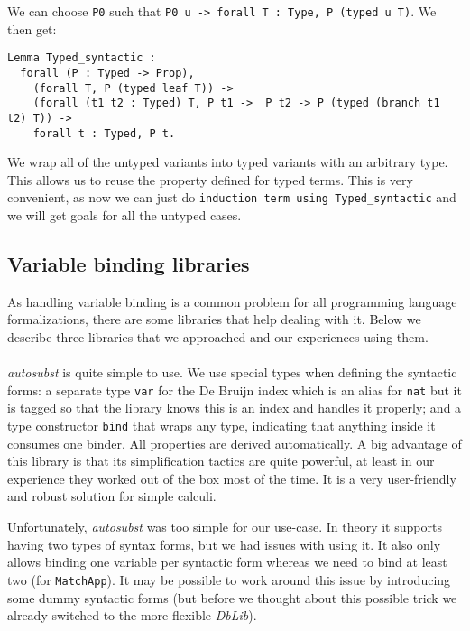 \documentclass[runningheads]{article}
\begin{document}
We can choose \texttt{P0} such that \texttt{P0 u -> forall T : Type, P (typed u T)}. We then get:

\begin{lstlisting}
Lemma Typed_syntactic :
  forall (P : Typed -> Prop),
    (forall T, P (typed leaf T)) ->
    (forall (t1 t2 : Typed) T, P t1 ->  P t2 -> P (typed (branch t1 t2) T)) ->
    forall t : Typed, P t.
\end{lstlisting}

We wrap all of the untyped variants into typed variants with an arbitrary type. This allows us to reuse the property defined for typed terms. This is very convenient, as now we can just do \texttt{induction term using Typed\_syntactic} and we will get goals for all the untyped cases.

\subsection{Variable binding libraries}
\label{binderlibs}

As handling variable binding is a common problem for all programming language formalizations, there are some libraries that help dealing with it. Below we describe three libraries that we approached and our experiences using them.

\paragraph{}

\textit{autosubst} \cite{autosubst} is quite simple to use. We use special types when defining the syntactic forms: a separate type \verb|var| for the De Bruijn index which is an alias for \verb|nat| but it is tagged so that the library knows this is an index and handles it properly; and a type constructor \verb|bind| that wraps any type, indicating that anything inside it consumes one binder. All properties are derived automatically. A big advantage of this library is that its simplification tactics are quite powerful, at least in our experience they worked out of the box most of the time. It is a very user-friendly and robust solution for simple calculi.

Unfortunately, \textit{autosubst} was too simple for our use-case. In theory it supports having two types of syntax forms, but we had issues with using it. It also only allows binding one variable per syntactic form whereas we need to bind at least two (for \verb|MatchApp|). It may be possible to work around this issue by introducing some dummy syntactic forms (but before we thought about this possible trick we already switched to the more flexible \textit{DbLib}).
\end{document}
